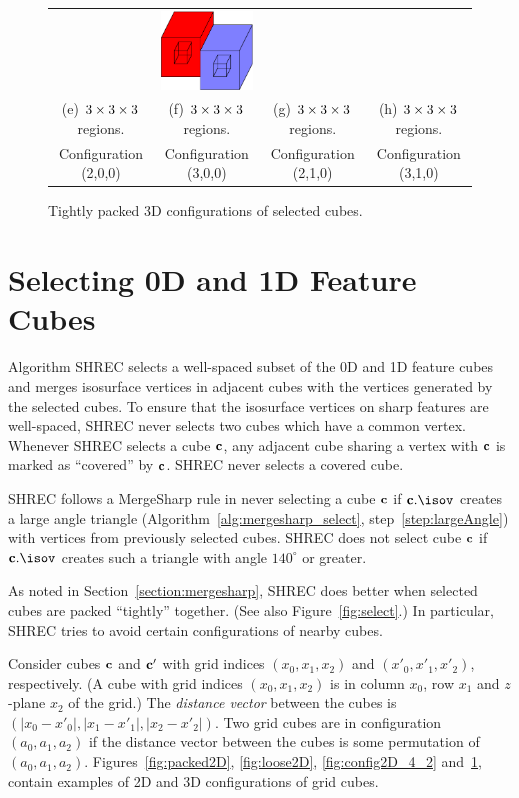 \begin{figure}[t]
\begin{tabular}{cccc}
\qquad &
\qquad
\includegraphics[width=1.2in]{images/config3D_3_1_0_3x3x3.eps} \\
(e) $3 \times 3 \times 3$ regions. & (f) $3 \times 3 \times 3$ regions. 
  & (g) $3 \times 3 \times 3$ regions. & (h) $3 \times 3 \times 3$ regions.\\
Configuration (2,0,0) & Configuration (3,0,0) 
  & Configuration (2,1,0) & Configuration (3,1,0)
\end{tabular}
\caption{Tightly packed 3D configurations of selected cubes.}
\label{fig:packed3D}
\end{figure}


\section{Selecting 0D and 1D Feature Cubes}
\label{section:selection}

Algorithm SHREC selects a well-spaced subset 
of the 0D and 1D feature cubes
and merges isosurface vertices in adjacent cubes 
with the vertices generated by the selected cubes.
To ensure that the isosurface vertices on sharp features are well-spaced,
SHREC never selects two cubes which have a common vertex.
Whenever SHREC selects a cube $\mathbf{c}$,
any adjacent cube sharing a vertex with $\mathbf{c}$ is marked as ``covered''
by $\mathbf{c}$.
SHREC never selects a covered cube.

SHREC follows a MergeSharp rule in never selecting a cube $\mathbf{c}$
if $\cb.\isov$ creates a large angle triangle 
(Algorithm~\ref{alg:mergesharp_select}, step~\ref{step:largeAngle})
with vertices from previously selected cubes.
SHREC does not select cube $\mathbf{c}$
if $\cb.\isov$ creates such a triangle with angle $140^\circ$ or greater.

As noted in Section~\ref{section:mergesharp}, 
SHREC does better when selected cubes 
are packed ``tightly'' together.
(See also Figure~\ref{fig:select}.)
In particular, SHREC tries to avoid certain configurations of nearby cubes.

Consider cubes $\mathbf{c}$ and $\mathbf{c}'$ with grid indices $(x_0,x_1,x_2)$
and $(x'_0,x'_1,x'_2)$, respectively.
(A cube with grid indices $(x_0,x_1,x_2)$ is in column $x_0$, row $x_1$
and $z$-plane $x_2$ of the grid.)
The {\em distance vector} between the cubes is
$(|x_0-x'_0|, |x_1-x'_1|, |x_2-x'_2|)$.
Two grid cubes are in configuration $(a_0,a_1,a_2)$ if the distance vector
between the cubes is some permutation of $(a_0,a_1,a_2)$.
Figures~\ref{fig:packed2D}, \ref{fig:loose2D}, \ref{fig:config2D_4_2}
and~\ref{fig:packed3D},
contain examples of 2D and 3D configurations of grid cubes.

